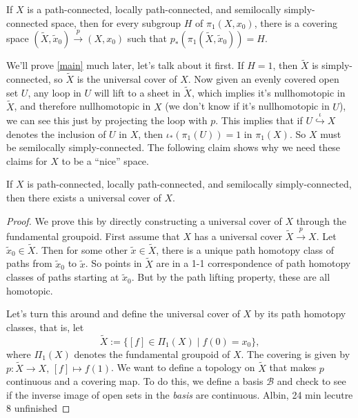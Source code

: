 \begin{prop}\label{main}
    If $X$ is a path-connected, locally path-connected, and semilocally simply-connected space, then for every subgroup $H$ of $\pi_1(X,x_0)$, there is a covering space $(\widetilde X,\widetilde x_0)\overset{p}{\to }(X,x_0)$ such that $p_*(\pi_1(\widetilde X,\widetilde x_0))=H$.
\end{prop}
We'll prove \cref{main} much later, let's talk about it first. If $H=1$, then $\widetilde X$ is simply-connected, so $\widetilde X$ is the universal cover of $X$. Now given an evenly covered open set $U$, any loop in $U$ will lift to a sheet in $\widetilde X$, which implies it's nullhomotopic in $\widetilde X$, and therefore nullhomotopic in $X$ (we don't know if it's nullhomotopic in $U$), we can see this just by projecting the loop with $p$. This implies that if $U \overset{\iota}{\hookrightarrow }X$ denotes the inclusion of $U$ in $X$, then $\iota_*(\pi_1(U))=1$ in $\pi_1(X)$. So $X$ must be semilocally simply-connected. The following claim shows why we need these claims for $X$ to be a ``nice'' space.
\begin{claim}
    If $X$ is path-connected, locally path-connected, and semilocally simply-connected, then there exists a universal cover of $X.$
\end{claim}
\begin{proof}
    We prove this by directly constructing a universal cover of $X$ through the fundamental groupoid. First assume that $X$ has a universal cover $\widetilde X\overset{p}{\to }X$. Let $\widetilde x_0\in \widetilde X$. Then for some other $\widetilde x\in \widetilde X$, there is a unique path homotopy class of paths from $\widetilde x_0$ to $\widetilde x$. So points in $\widetilde X$ are in a 1-1 correspondence of path homotopy classes of paths starting at $\widetilde x_0$. But by the path lifting property, these are all homotopic.

    Let's turn this around and define the universal cover of $X$ by its path homotopy classes, that is, let \[
        \widetilde X := \{[f]\in \Pi_1(X) \mid f(0)=x_0\},
    \] where $\Pi_1(X)$ denotes the fundamental groupoid of $X$. The covering is given by $p \colon \widetilde X \to X,\, [f]\mapsto f(1)$. We want to define a topology on $\widetilde X$ that makes $p$ continuous and a covering map. To do this, we define a basis $\mathscr{B}$ and check to see if the inverse image of open sets in the \emph{basis} are continuous. Albin, 24 min lecutre 8 unfinished
\end{proof}
